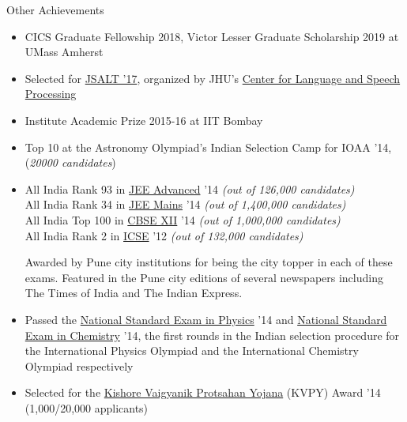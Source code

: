 \documentclass{resume} %
\begin{document}
\begin{rSection}{Other Achievements}
\begin{itemize}[leftmargin=*]

\item CICS Graduate Fellowship 2018, Victor Lesser Graduate Scholarship 2019 at UMass Amherst

\item Selected for \href{https://www.lti.cs.cmu.edu/2017-jsalt-undergraduate}{JSALT '17}, organized by JHU's \href{https://www.clsp.jhu.edu/}{Center for Language and Speech Processing}\footnotemark[2] 
\item Institute Academic Prize 2015-16 at IIT Bombay
\item Top 10 at the Astronomy Olympiad's Indian Selection Camp for IOAA '14, (\textit{20000 candidates})
\item All India Rank 93 in \href{https://en.wikipedia.org/wiki/Joint_Entrance_Examination}{JEE Advanced} '14 \textit{(out of 126,000 candidates)} \\ All India Rank 34 in \href{https://en.wikipedia.org/wiki/Joint_Entrance_Examination}{JEE Mains} '14 \textit{(out of 1,400,000 candidates)} \\
All India Top 100 in \href{https://en.wikipedia.org/wiki/Central_Board_of_Secondary_Education}{CBSE XII} '14 \textit{(out of 1,000,000 candidates)} \\
All India Rank 2 in \href{https://en.wikipedia.org/wiki/Indian_Certificate_of_Secondary_Education}{ICSE} '12 \textit{(out of 132,000 candidates)} \vspace{0.01in}

Awarded by Pune city institutions for being the city topper in each of these exams. Featured in the Pune city editions of several newspapers including The Times of India and The Indian Express.
\item Passed the \href{https://www.iapt.org.in/exams/nse/nsep.html}{National Standard Exam in Physics} '14 and \href{https://www.iapt.org.in/exams/nse/nsec-b-a-js.html}{National Standard Exam in Chemistry} '14, the first rounds in the Indian selection procedure for the International Physics Olympiad and the International Chemistry Olympiad respectively
\item Selected for the \href{http://www.kvpy.iisc.ernet.in/main/index.htm}{Kishore Vaigyanik Protsahan Yojana} (KVPY) Award '14 (1,000/20,000 applicants)
\end{itemize}
\end{rSection}
\end{document}
